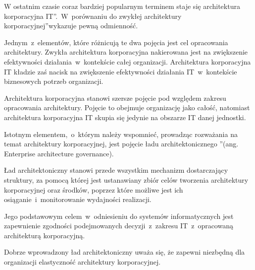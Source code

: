 W ostatnim czasie coraz bardziej popularnym terminem staje się \quotedblbase architektura korporacyjna IT\textquotedblright.~W~porównaniu do \quotedblbase zwykłej architektury korporacyjnej\textquotedblright wykazuje pewną odmienność.

Jednym~z~elementów, które różnicują te dwa pojęcia jest cel opracowania architektury. Zwykła architektura korporacyjna nakierowana jest na zwiększenie efektywności działania~w~kontekście całej organizacji. Architektura korporacyjna IT kładzie zaś nacisk na zwiększenie efektywności działania IT~w~kontekście biznesowych potrzeb organizacji. 

Architektura korporacyjna stanowi szersze pojęcie pod względem zakresu opracowania architektury. Pojęcie to obejmuje organizację jako całość, natomiast architektura korporacyjna IT skupia się jedynie na obszarze IT danej jednostki. 

Istotnym elementem,~o~którym należy wspomnieć, prowadząc rozważania na temat architektury korporacyjnej, jest pojęcie \quotedblbase ładu architektonicznego \textquotedblright (ang. Enterprise architecture governance). 

Ład architektoniczny stanowi przede wszystkim mechanizm dostarczający struktury, za pomocą której jest ustanawiany zbiór celów tworzenia architektury korporacyjnej oraz środków, poprzez które możliwe jest ich osiąganie~i~monitorowanie wydajności realizacji. 

Jego podstawowym celem~w~odniesieniu do systemów informatycznych jest zapewnienie zgodności podejmowanych decyzji~z~zakresu IT~z~opracowaną architekturą korporacyjną. 

Dobrze wprowadzony ład architektoniczny uważa się, że zapewni niezbędną dla organizacji elastyczność architektury korporacyjnej.

